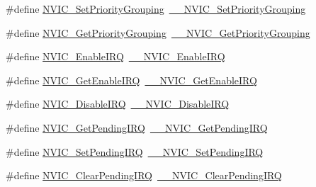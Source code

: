 \begin{DoxyCompactItemize}
\item 
\#define \hyperlink{group___c_m_s_i_s___core___n_v_i_c_functions_ga0e798d5aec68cdd8263db86a76df788f}{N\+V\+I\+C\+\_\+\+Set\+Priority\+Grouping}~\hyperlink{group___c_m_s_i_s___core___n_v_i_c_functions_gafc94dcbaee03e4746ade1f5bb9aaa56d}{\+\_\+\+\_\+\+N\+V\+I\+C\+\_\+\+Set\+Priority\+Grouping}
\item 
\#define \hyperlink{group___c_m_s_i_s___core___n_v_i_c_functions_ga4eeb9214f2264fc23c34ad5de2d3fa11}{N\+V\+I\+C\+\_\+\+Get\+Priority\+Grouping}~\hyperlink{group___c_m_s_i_s___core___n_v_i_c_functions_ga9b894af672df4373eb637f8288845c05}{\+\_\+\+\_\+\+N\+V\+I\+C\+\_\+\+Get\+Priority\+Grouping}
\item 
\#define \hyperlink{group___c_m_s_i_s___core___n_v_i_c_functions_ga57b3064413dbc7459d9646020fdd8bef}{N\+V\+I\+C\+\_\+\+Enable\+I\+RQ}~\hyperlink{group___c_m_s_i_s___core___n_v_i_c_functions_ga71227e1376cde11eda03fcb62f1b33ea}{\+\_\+\+\_\+\+N\+V\+I\+C\+\_\+\+Enable\+I\+RQ}
\item 
\#define \hyperlink{group___c_m_s_i_s___core___n_v_i_c_functions_ga857de13232ec65dd15087eaa15bc4a69}{N\+V\+I\+C\+\_\+\+Get\+Enable\+I\+RQ}~\hyperlink{group___c_m_s_i_s___core___n_v_i_c_functions_gaaeb5e7cc0eaad4e2817272e7bf742083}{\+\_\+\+\_\+\+N\+V\+I\+C\+\_\+\+Get\+Enable\+I\+RQ}
\item 
\#define \hyperlink{group___c_m_s_i_s___core___n_v_i_c_functions_ga73b4e251f59cab4e9a5e234aac02ae57}{N\+V\+I\+C\+\_\+\+Disable\+I\+RQ}~\hyperlink{group___c_m_s_i_s___core___n_v_i_c_functions_gae016e4c1986312044ee768806537d52f}{\+\_\+\+\_\+\+N\+V\+I\+C\+\_\+\+Disable\+I\+RQ}
\item 
\#define \hyperlink{group___c_m_s_i_s___core___n_v_i_c_functions_gac608957a239466e9e0cbc30aa64feb3b}{N\+V\+I\+C\+\_\+\+Get\+Pending\+I\+RQ}~\hyperlink{group___c_m_s_i_s___core___n_v_i_c_functions_ga5a92ca5fa801ad7adb92be7257ab9694}{\+\_\+\+\_\+\+N\+V\+I\+C\+\_\+\+Get\+Pending\+I\+RQ}
\item 
\#define \hyperlink{group___c_m_s_i_s___core___n_v_i_c_functions_ga2b47e2e52cf5c48a5c3348636434b3ac}{N\+V\+I\+C\+\_\+\+Set\+Pending\+I\+RQ}~\hyperlink{group___c_m_s_i_s___core___n_v_i_c_functions_gaabefdd4b790b9a7308929938c0c1e1ad}{\+\_\+\+\_\+\+N\+V\+I\+C\+\_\+\+Set\+Pending\+I\+RQ}
\item 
\#define \hyperlink{group___c_m_s_i_s___core___n_v_i_c_functions_ga590cf113000a079b1f0ea3dcd5b5316c}{N\+V\+I\+C\+\_\+\+Clear\+Pending\+I\+RQ}~\hyperlink{group___c_m_s_i_s___core___n_v_i_c_functions_ga562a86dbdf14827d0fee8fdafb04d191}{\+\_\+\+\_\+\+N\+V\+I\+C\+\_\+\+Clear\+Pending\+I\+RQ}

\end{DoxyCompactItemize}
